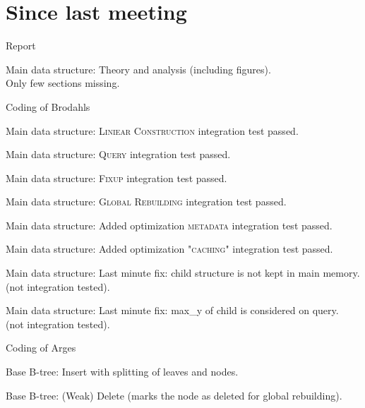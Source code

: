 \documentclass[a4paper,11pt,agenda,chair]{meetingmins}
\begin{document}
\maketitle

\section{Since last meeting}
\begin{items}
\item Report
	\begin{items}
		\item Main data structure: Theory and analysis (including figures). \\Only few sections missing.
	\end{items}
\item Coding of Brodahls
	\begin{items}
		\item Main data structure: \textsc{Liniear Construction} integration test passed.
		\item Main data structure: \textsc{Query} integration test passed.
		\item Main data structure: \textsc{Fixup} integration test passed.
		\item Main data structure: \textsc{Global Rebuilding} integration test passed.
		\item Main data structure: Added optimization \textsc{metadata} integration test passed.
		\item Main data structure: Added optimization \textsc{"caching"} integration test passed.
		\item Main data structure: Last minute fix: child structure is not kept in main memory.\\ (not integration tested).
		\item Main data structure: Last minute fix: max\_y of child is considered on query.\\ (not integration tested).
	\end{items}
\item Coding of Arges
	\begin{items}
		\item Base B-tree: Insert with splitting of leaves and nodes.
		\item Base B-tree: (Weak) Delete (marks the node as deleted for global rebuilding).
	\end{items}
\end{items}
\end{document}
